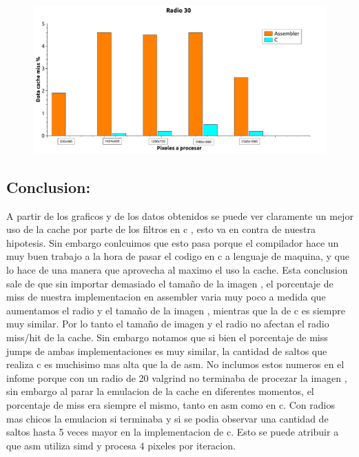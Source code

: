 \begin{figure}[H]
\begin{center}
  \includegraphics[width=\linewidth]{cache/Radio30.pdf}
\end{center}
\end{figure}

\subsection{Conclusion:} 

A partir de los graficos y de los datos obtenidos se puede ver claramente un mejor uso de la cache por parte de los filtros en c , esto va en contra de nuestra hipotesis. Sin embargo conlcuimos que esto pasa porque el compilador hace un muy buen trabajo a la hora de pasar el codigo en c a lenguaje de maquina, y que lo hace de una manera que aprovecha al maximo el uso la cache. Esta conclusion sale de que sin importar demasiado el tamaño de la imagen , el porcentaje de miss de nuestra implementacion en assembler varia muy poco a medida que aumentamos el radio y el tamaño de la imagen , mientras que la de c es siempre muy similar. Por lo tanto el tamaño de imagen y el radio no afectan el radio miss/hit de la cache. Sin embargo notamos que si bien el porcentaje de miss jumps de ambas implementaciones es muy similar, la cantidad de saltos que realiza c es muchisimo mas alta que la de asm. No inclumos estos numeros en el infome porque con un radio de 20 valgrind no terminaba de procezar la imagen , sin embargo al parar la emulacion de la cache en diferentes momentos, el porcentaje de miss era siempre el mismo, tanto en asm como en c. Con radios mas chicos la emulacion si terminaba y si se podia observar una cantidad de saltos hasta 5 veces mayor en la implementacion de c. Esto se puede atribuir a que asm utiliza simd y procesa 4 pixeles por iteracion.

